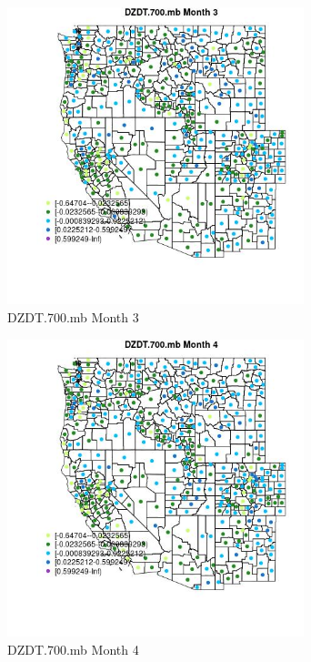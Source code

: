 \begin{figure} 
\centering  
\includegraphics[width=0.77\textwidth]{Code_Outputs/df_report_ML_predictors_CountyCentroid_Locations_Dates_2008-01-01to2018-12-31_MapObsMo3DZDT700mb.jpg} 
\caption{\label{fig:df_report_ML_predictors_CountyCentroid_Locations_Dates_2008-01-01to2018-12-31MapObsMo3DZDT700mb}DZDT.700.mb Month 3} 
\end{figure} 
 

\clearpage 

\begin{figure} 
\centering  
\includegraphics[width=0.77\textwidth]{Code_Outputs/df_report_ML_predictors_CountyCentroid_Locations_Dates_2008-01-01to2018-12-31_MapObsMo4DZDT700mb.jpg} 
\caption{\label{fig:df_report_ML_predictors_CountyCentroid_Locations_Dates_2008-01-01to2018-12-31MapObsMo4DZDT700mb}DZDT.700.mb Month 4} 
\end{figure} 
 

